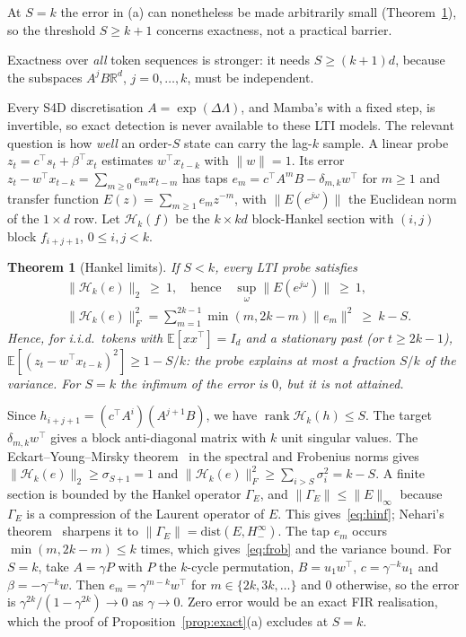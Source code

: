 \documentclass[journal]{IEEEtran}
\newtheorem{theorem}{Theorem}
\theoremstyle{remark}
\newcommand{\R}{\mathbb{R}}
\newcommand{\E}{\mathbb{E}}
\newcommand{\Hk}{\mathcal{H}_k}
\DeclareMathOperator{\rank}{rank}
\begin{document}
At $S=k$ the error in (a) can nonetheless be made arbitrarily small
(Theorem~\ref{thm:hankel}), so the threshold $S\ge k+1$ concerns exactness,
not a practical barrier.

Exactness over \emph{all} token sequences is stronger: it needs
$S\ge(k+1)d$, because the subspaces $A^jB\R^d$, $j=0,\dots,k$, must be
independent.

Every S4D discretisation $A=\exp(\Delta\Lambda)$, and Mamba's with a fixed
step, is invertible, so exact detection is never available to these LTI
models. The relevant question is how
\emph{well} an order-$S$ state can carry the lag-$k$ sample. A linear
probe $z_t=c^\top s_t+\beta^\top x_t$ estimates $w^\top x_{t-k}$ with
$\|w\|=1$. Its error $z_t-w^\top x_{t-k}=\sum_{m\ge0}e_mx_{t-m}$ has taps
$e_m=c^\top A^mB-\delta_{m,k}w^\top$ for $m\ge1$ and transfer function
$E(z)=\sum_{m\ge1}e_mz^{-m}$, with $\|E(e^{j\omega})\|$ the Euclidean norm of
the $1\times d$ row. Let $\Hk(f)$ be the $k\times kd$ block-Hankel section
with $(i,j)$ block $f_{i+j+1}$, $0\le i,j<k$.

\begin{theorem}[Hankel limits]\label{thm:hankel}
If $S<k$, every LTI probe satisfies
\begin{align}
 &\|\Hk(e)\|_2\ \ge\ 1,\quad\text{hence}\quad \textstyle\sup_\omega\|E(e^{j\omega})\|\ \ge\ 1, \label{eq:hinf}\\
 &\|\Hk(e)\|_F^2=\textstyle\sum_{m=1}^{2k-1}\min(m,2k-m)\|e_m\|^2\ \ge\ k-S. \label{eq:frob}
\end{align}
Hence, for i.i.d.\ tokens with $\E[xx^\top]=I_d$ and a stationary past (or
$t\ge2k-1$), $\E[(z_t-w^\top x_{t-k})^2]\ge1-S/k$: the probe explains at most
a fraction $S/k$ of the variance. For $S=k$ the infimum of the error is $0$,
but it is not attained.
\end{theorem}
\begin{IEEEproof}
Since $h_{i+j+1}=(c^\top A^i)(A^{j+1}B)$, we have $\rank\Hk(h)\le S$. The
target $\delta_{m,k}w^\top$ gives a block anti-diagonal matrix with $k$ unit
singular values. The Eckart--Young--Mirsky theorem~\cite{eckart1936,mirsky1960} in the
spectral and Frobenius norms gives $\|\Hk(e)\|_2\ge\sigma_{S+1}=1$ and
$\|\Hk(e)\|_F^2\ge\sum_{i>S}\sigma_i^2=k-S$. A finite section is bounded by
the Hankel operator $\Gamma_E$, and $\|\Gamma_E\|\le\|E\|_\infty$ because
$\Gamma_E$ is a compression of the Laurent operator of $E$. This
gives~\eqref{eq:hinf}; Nehari's theorem~\cite{nehari1957} sharpens it to
$\|\Gamma_E\|=\mathrm{dist}(E,H^\infty_-)$. The tap $e_m$ occurs $\min(m,2k-m)\le k$ times,
which gives~\eqref{eq:frob} and the variance bound. For $S=k$, take
$A=\gamma P$ with $P$ the $k$-cycle permutation, $B=u_1w^\top$,
$c=\gamma^{-k}u_1$ and $\beta=-\gamma^{-k}w$. Then $e_m=\gamma^{m-k}w^\top$
for $m\in\{2k,3k,\dots\}$ and $0$ otherwise, so the error is
$\gamma^{2k}/(1-\gamma^{2k})\to0$ as $\gamma\to0$. Zero error would be an
exact FIR realisation, which the proof of Proposition~\ref{prop:exact}(a)
excludes at $S=k$.
\end{IEEEproof}
\end{document}
